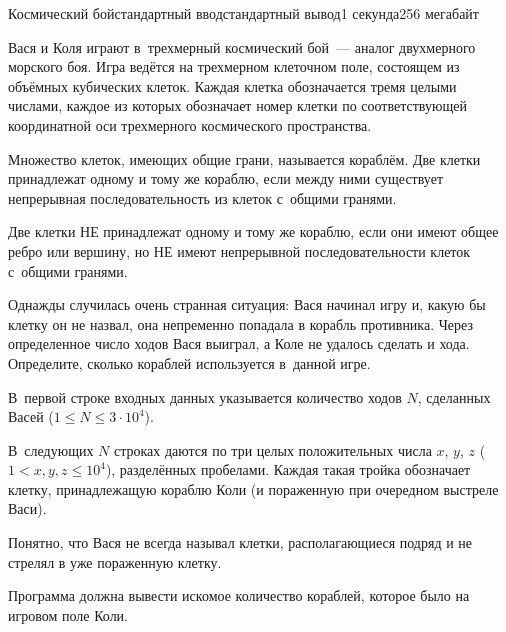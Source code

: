 \begin{problem}{Космический бой}{стандартный ввод}{стандартный вывод}{1 секунда}{256 мегабайт}

Вася и Коля играют в~трехмерный космический бой~--- аналог двухмерного морского боя. Игра ведётся на трехмерном клеточном поле, состоящем из объёмных кубических клеток. Каждая клетка обозначается тремя целыми числами, каждое из которых обозначает номер клетки по соответствующей координатной оси трехмерного космического пространства.

Множество клеток, имеющих общие грани, называется кораблём. Две клетки принадлежат одному и тому же кораблю, если между ними существует непрерывная последовательность из клеток с~общими гранями.

Две клетки НЕ принадлежат одному и тому же кораблю, если они имеют общее ребро или вершину, но НЕ имеют непрерывной последовательности клеток с~общими гранями.

Однажды случилась очень странная ситуация: Вася начинал игру и, какую бы клетку он не назвал, она непременно попадала в корабль противника. Через определенное число ходов Вася выиграл, а Коле не удалось сделать и хода. Определите, сколько кораблей используется в~данной игре.

\InputFile
В~первой строке входных данных указывается количество ходов $N$, сделанных Васей ($1 \leq N \leq 3 \cdot 10^4$).

В~следующих $N$ строках даются по три целых положительных числа $x$, $y$, $z$ ($1 < x, y, z \leq 10^4$), разделённых пробелами. Каждая такая тройка обозначает клетку, принадлежащую кораблю Коли (и пораженную при очередном выстреле Васи).

Понятно, что Вася не всегда называл клетки, располагающиеся подряд и не стрелял в уже пораженную клетку.

\OutputFile
Программа должна вывести искомое количество кораблей, которое было на игровом поле Коли.

\Examples

\begin{example}
%
%
\end{example}

\end{problem}

